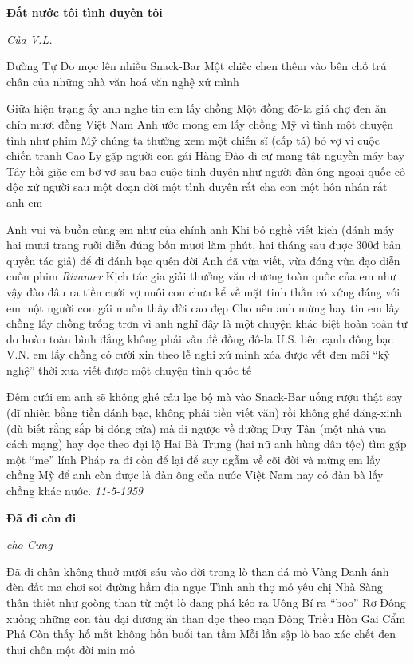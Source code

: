 \documentclass[../main.tex]{subfiles}
\begin{document}
\begin{multicols}{2}
 
\textbf{Đất nước tôi tình duyên tôi}        
 		\begin{blockquote}
\textit{Của V.L.}\end{blockquote}
        
 
Đường Tự Do mọc lên nhiều Snack-Bar 
Một chiếc chen thêm vào bên chỗ trú chân của những nhà văn hoá văn nghệ xứ mình        
 
Giữa hiện trạng ấy anh nghe tin em lấy chồng 
Một đồng đô-la giá chợ đen ăn chín mươi đồng Việt Nam  
Anh ước mong em lấy chồng Mỹ vì tình 
một chuyện tình như phim Mỹ chúng ta thường xem 
một chiến sĩ (cấp tá) bỏ vợ vì cuộc chiến tranh Cao Ly 
gặp người con gái Hàng Đào di cư mang tật nguyền máy bay Tây hồi giặc 
em bơ vơ sau bao cuộc tình duyên 
như người đàn ông ngoại quốc cô độc xứ người sau một đoạn đời 
một tình duyên rất cha con 
một hôn nhân rất anh em 
 
Anh vui và buồn cùng em như của chính anh 
Khi bỏ nghề viết kịch (đánh máy hai mươi trang rưỡi diễn đúng bốn mươi lăm phút, hai tháng sau được 300đ bản quyền tác giả) để đi đánh bạc quên đời 
Anh đã vừa viết, vừa đóng vừa đạo diễn cuốn phim \textit{Rizamer} 
Kịch tác gia giải thưởng văn chương toàn quốc của em như vậy đào đâu ra tiền cưới vợ nuôi con 
chưa kể về mặt tinh thần  
có xứng đáng với em một người con gái muốn thấy đời cao đẹp 
Cho nên anh mừng hay tin em lấy chồng 
lấy chồng trống trơn 
vì anh nghĩ đây là một chuyện khác biệt 
hoàn toàn tự do 
hoàn toàn bình đẳng 
không phải vấn đề đồng đô-la U.S. bên cạnh đồng bạc V.N.  
em lấy chồng có cưới xin theo lễ nghi xứ mình 
xóa được vết đen môi “kỹ nghệ” thời xưa 
viết được một chuyện tình quốc tế 
 
Đêm cưới em anh sẽ không ghé câu lạc bộ mà vào Snack-Bar uống rượu thật say 
(dĩ nhiên bằng tiền đánh bạc, không phải tiền viết văn) 
rồi không ghé đăng-xinh (dù biết rằng sắp bị đóng cửa) mà đi ngược về đường Duy Tân (một nhà vua cách mạng) hay dọc theo đại lộ Hai Bà Trưng (hai nữ anh hùng dân tộc) tìm gặp một “me” lính Pháp ra đi còn để lại 
để suy ngẫm về cõi đời 
và mừng em lấy chồng Mỹ 
để anh còn được là đàn ông của nước Việt Nam 
nay có đàn bà lấy chồng khác nước.        
\textit{11-5-1959}        
 
        
\textbf{Đã đi còn đi}        
 	\begin{blockquote}
\textit{cho Cung}\end{blockquote}
        
 
Đã đi chân không thuở mười sáu vào đời 
trong lò than đá mỏ Vàng Danh 
ánh đèn đất ma chơi soi đường hầm địa ngục 
Tình anh thợ mỏ yêu chị Nhà Sàng 
thân thiết như goòng than 
từ một lò đang phá 
kéo ra Uông Bí ra “boo” Rơ Đông 
xuống những con tàu đại dương ăn than 
dọc theo mạn Đông Triều Hòn Gai Cẩm Phả 
Còn thấy hố mắt không hồn buổi tan tầm 
Mỗi lần sập lò bao xác chết đen thui 
chôn một đời min mỏ 
 

\end{multicols}
\end{document}
